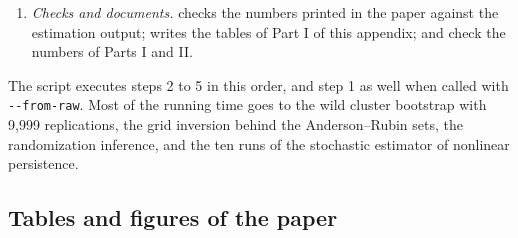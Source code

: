 \begin{enumerate}
 describes the sample and
supplies the first stages on all children;  splits the premium inside the balanced comparison;  runs the census check; then the other scripts of
, among them  and .
\item \emph{Checks and documents.}
 checks the numbers printed in the paper against the estimation output;
 writes the tables of Part I
of this appendix; 
and  check the numbers of Parts I and II.
\end{enumerate}

\noindent The script  executes steps 2 to 5 in this order, and step 1 as well when called with \texttt{-{}-from-raw}. Most of the running time goes to the wild cluster bootstrap with 9,999 replications, the grid inversion behind the Anderson--Rubin sets, the randomization inference, and the ten runs of the stochastic estimator of nonlinear persistence.

\clearpage
\subsection{Tables and figures of the paper}

